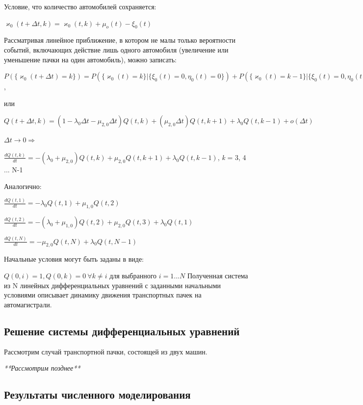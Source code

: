 \documentclass[a4paper, 14pt, russian]{article}
\begin{document}
Условие, что количество автомобилей сохраняется:

$\varkappa_0(t + \Delta t, k) = \varkappa_0(t, k) + \mu_o(t) - \xi_0(t)$

Рассматривая линейное приближение, в котором не малы только вероятности событий, включающих действие лишь одного автомобиля (увеличение или уменьшение пачки на один автомобиль), можно записать:

$P(\{\varkappa_0(t + \Delta t) = k\}) = P(\{\varkappa_0(t) = k\} | \{\xi_0(t) = 0, \eta_0(t) = 0\}) + P(\{\varkappa_0(t) = k-1\} | \{\xi_0(t) = 0, \eta_0(t) = 1\}) + 
P(\{\varkappa_0(t) = k+1\} | \{\xi_0(t) = 1, \eta_0(t) = 0\}) + o(\Delta t)$,

или

$Q(t + \Delta t, k) = (1 - \lambda_0 \Delta t - \mu_{2,0} \Delta t ) Q(t, k) + (\mu_{2,0} \Delta t) Q(t, k+1) + \lambda_0 Q(t, k-1) + o(\Delta t)$

$\Delta t \rightarrow 0\Rightarrow $

$\frac{dQ(t, k)}{dt} = -(\lambda_0 + \mu_{2,0}) Q(t, k) + \mu_{2,0} Q(t, k + 1) + 
\lambda_0 Q(t, k-1)$, \textit{k} = 3, 4 ... N-1

Аналогично:

$\frac{dQ(t, 1)}{dt} = -\lambda_0 Q(t, 1) + \mu_{1,0} Q(t, 2)$

$\frac{dQ(t, 2)}{dt} = -(\lambda_0 + \mu_{1,0}) Q(t, 2) + \mu_{2,0} Q(t, 3) + 
\lambda_0 Q(t, 1)$

$\frac{dQ(t, N)}{dt} = - \mu_{2,0} Q(t, N) + \lambda_0 Q(t, N - 1)$

Начальные условия могут быть заданы в виде:

$Q(0, i) = 1, Q(0, k) = 0 \ \forall k \neq i$ для выбранного $i = 1 ... N$
Полученная  система из N линейных дифференциальных уравнений с заданными начальными условиями описывает динамику движения транспортных пачек на автомагистрали.

\subsection{Решение системы дифференциальных уравнений}
Рассмотрим случай транспортной пачки, состоящей из двух машин.

\textit{**Рассмотрим позднее**}

\subsection{Результаты численного моделирования}
\end{document}
